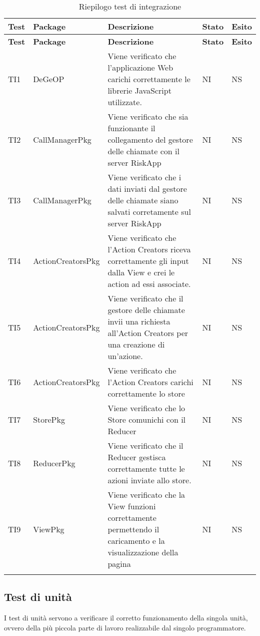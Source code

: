 		\def\arraystretch{1.5}
		\begin{longtable}{p{1cm}!{\VRule[1pt]}p{3cm}!{\VRule[1pt]}p{5cm}!{\VRule[1pt]}p{1.5cm}!{\VRule[1pt]}p{1.5cm}}
			\color{white} \textbf{Test} & \color{white} \textbf{Package} & \color{white} \textbf{Descrizione} & \color{white} \textbf{Stato} & \color{white} \textbf{Esito} \\ 
			\endfirsthead
			\color{white} \textbf{Test} & \color{white} \textbf{Package} & \color{white} \textbf{Descrizione} & \color{white} \textbf{Stato} & \color{white} \textbf{Esito} \\ 
			\endhead
			TI1 & DeGeOP & Viene verificato che l’applicazione Web carichi correttamente le librerie JavaScript utilizzate. & NI & NS\\
			TI2 & CallManagerPkg & Viene verificato che sia funzionante il collegamento del gestore delle chiamate con il server RiskApp & NI & NS\\
			TI3 & CallManagerPkg & Viene verificato che i dati inviati dal gestore delle chiamate siano salvati corretamente sul server RiskApp & NI & NS\\
			TI4 & ActionCreatorsPkg & Viene verificato che l’Action Creators riceva correttamente gli input dalla View e crei le action ad essi associate. & NI & NS\\
			TI5 & ActionCreatorsPkg & Viene verificato che il gestore delle chiamate invii una richiesta all'Action Creators per una creazione di un'azione. & NI & NS\\
			TI6 & ActionCreatorsPkg & Viene verificato che l'Action Creators carichi correttamente lo store & NI & NS\\
			TI7 & StorePkg & Viene verificato che lo Store comunichi con il Reducer & NI & NS\\
			TI8 & ReducerPkg & Viene verificato che il Reducer gestisca correttamente tutte le azioni inviate allo store. & NI & NS\\
			TI9 & ViewPkg & Viene verificato che la View funzioni correttamente permettendo il caricamento e la visualizzazione della pagina & NI & NS\\
			\caption{Riepilogo test di integrazione}
		\end{longtable}
		
		
	\subsection{Test di unità}
		I test di unità servono a verificare il corretto funzionamento della singola unità, ovvero della più piccola parte di lavoro realizzabile dal singolo programmatore.